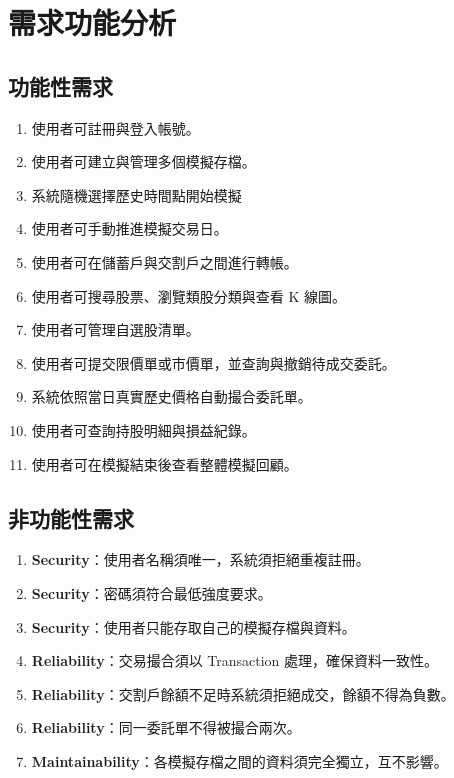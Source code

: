 \documentclass[UTF8, a4paper, 12pt, fontset=none]{ctexart}
\begin{document}
    
    \section{需求功能分析}
    \subsection{功能性需求}
    \begin{enumerate}
        \item 使用者可註冊與登入帳號。
        \item 使用者可建立與管理多個模擬存檔。
        \item 系統隨機選擇歷史時間點開始模擬
        \item 使用者可手動推進模擬交易日。
        \item 使用者可在儲蓄戶與交割戶之間進行轉帳。
        \item 使用者可搜尋股票、瀏覽類股分類與查看 K 線圖。
        \item 使用者可管理自選股清單。
        \item 使用者可提交限價單或市價單，並查詢與撤銷待成交委託。
        \item 系統依照當日真實歷史價格自動撮合委託單。
        \item 使用者可查詢持股明細與損益紀錄。
        \item 使用者可在模擬結束後查看整體模擬回顧。
    \end{enumerate}

    \subsection{非功能性需求}
    \begin{enumerate}
        \item \textbf{Security}：使用者名稱須唯一，系統須拒絕重複註冊。
        \item \textbf{Security}：密碼須符合最低強度要求。
        \item \textbf{Security}：使用者只能存取自己的模擬存檔與資料。
        \item \textbf{Reliability}：交易撮合須以 Transaction 處理，確保資料一致性。
        \item \textbf{Reliability}：交割戶餘額不足時系統須拒絕成交，餘額不得為負數。
        \item \textbf{Reliability}：同一委託單不得被撮合兩次。
        \item \textbf{Maintainability}：各模擬存檔之間的資料須完全獨立，互不影響。
    \end{enumerate}
\end{document}
